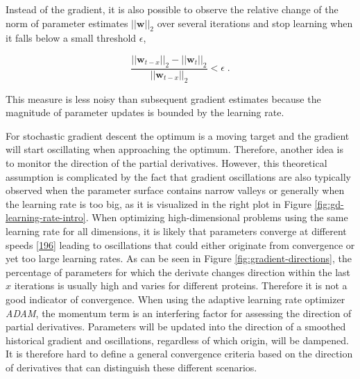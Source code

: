 \documentclass[11pt,a4paper,twoside]{book}
\newcommand{\w}{\mathbf{w}}
\theoremstyle{definition}
\theoremstyle{definition}
\theoremstyle{remark}
\begin{document}
Instead of the gradient, it is also possible to observe the relative
change of the norm of parameter estimates \(||\w||_2\) over several
iterations and stop learning when it falls below a small threshold
\(\epsilon\),

\begin{equation}
  \frac{||\w_{t-x}||_2 - ||\w_t||_2}{||\w_{t-x}||_2} < \epsilon \; .
  \label{eq:parameter-convergence-criterion}
\end{equation}

This measure is less noisy than subsequent gradient estimates because
the magnitude of parameter updates is bounded by the learning rate.

For stochastic gradient descent the optimum is a moving target and the
gradient will start oscillating when approaching the optimum. Therefore,
another idea is to monitor the direction of the partial derivatives.
However, this theoretical assumption is complicated by the fact that
gradient oscillations are also typically observed when the parameter
surface contains narrow valleys or generally when the learning rate is
too big, as it is visualized in the right plot in Figure
\ref{fig:gd-learning-rate-intro}. When optimizing high-dimensional
problems using the same learning rate for all dimensions, it is likely
that parameters converge at different speeds
{[}\protect\hyperlink{ref-Ruder2017}{196}{]} leading to oscillations
that could either originate from convergence or yet too large learning
rates. As can be seen in Figure \ref{fig:gradient-directions}, the
percentage of parameters for which the derivate changes direction within
the last \(x\) iterations is usually high and varies for different
proteins. Therefore it is not a good indicator of convergence. When
using the adaptive learning rate optimizer \emph{ADAM}, the momentum
term is an interfering factor for assessing the direction of partial
derivatives. Parameters will be updated into the direction of a smoothed
historical gradient and oscillations, regardless of which origin, will
be dampened. It is therefore hard to define a general convergence
criteria based on the direction of derivatives that can distinguish
these different scenarios.
\end{document}

